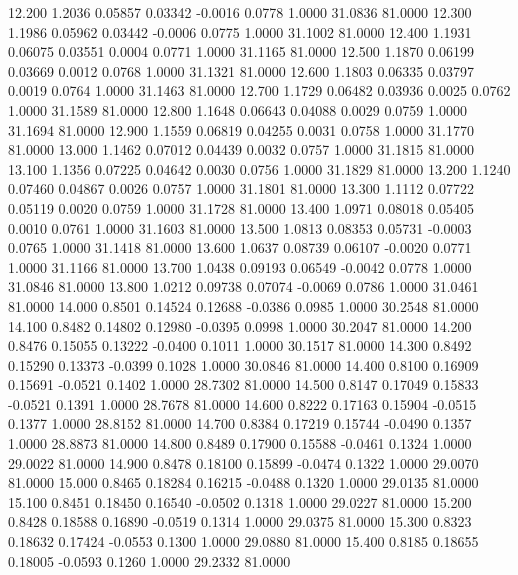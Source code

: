   12.200   1.2036   0.05857   0.03342  -0.0016   0.0778   1.0000  31.0836  81.0000
  12.300   1.1986   0.05962   0.03442  -0.0006   0.0775   1.0000  31.1002  81.0000
  12.400   1.1931   0.06075   0.03551   0.0004   0.0771   1.0000  31.1165  81.0000
  12.500   1.1870   0.06199   0.03669   0.0012   0.0768   1.0000  31.1321  81.0000
  12.600   1.1803   0.06335   0.03797   0.0019   0.0764   1.0000  31.1463  81.0000
  12.700   1.1729   0.06482   0.03936   0.0025   0.0762   1.0000  31.1589  81.0000
  12.800   1.1648   0.06643   0.04088   0.0029   0.0759   1.0000  31.1694  81.0000
  12.900   1.1559   0.06819   0.04255   0.0031   0.0758   1.0000  31.1770  81.0000
  13.000   1.1462   0.07012   0.04439   0.0032   0.0757   1.0000  31.1815  81.0000
  13.100   1.1356   0.07225   0.04642   0.0030   0.0756   1.0000  31.1829  81.0000
  13.200   1.1240   0.07460   0.04867   0.0026   0.0757   1.0000  31.1801  81.0000
  13.300   1.1112   0.07722   0.05119   0.0020   0.0759   1.0000  31.1728  81.0000
  13.400   1.0971   0.08018   0.05405   0.0010   0.0761   1.0000  31.1603  81.0000
  13.500   1.0813   0.08353   0.05731  -0.0003   0.0765   1.0000  31.1418  81.0000
  13.600   1.0637   0.08739   0.06107  -0.0020   0.0771   1.0000  31.1166  81.0000
  13.700   1.0438   0.09193   0.06549  -0.0042   0.0778   1.0000  31.0846  81.0000
  13.800   1.0212   0.09738   0.07074  -0.0069   0.0786   1.0000  31.0461  81.0000
  14.000   0.8501   0.14524   0.12688  -0.0386   0.0985   1.0000  30.2548  81.0000
  14.100   0.8482   0.14802   0.12980  -0.0395   0.0998   1.0000  30.2047  81.0000
  14.200   0.8476   0.15055   0.13222  -0.0400   0.1011   1.0000  30.1517  81.0000
  14.300   0.8492   0.15290   0.13373  -0.0399   0.1028   1.0000  30.0846  81.0000
  14.400   0.8100   0.16909   0.15691  -0.0521   0.1402   1.0000  28.7302  81.0000
  14.500   0.8147   0.17049   0.15833  -0.0521   0.1391   1.0000  28.7678  81.0000
  14.600   0.8222   0.17163   0.15904  -0.0515   0.1377   1.0000  28.8152  81.0000
  14.700   0.8384   0.17219   0.15744  -0.0490   0.1357   1.0000  28.8873  81.0000
  14.800   0.8489   0.17900   0.15588  -0.0461   0.1324   1.0000  29.0022  81.0000
  14.900   0.8478   0.18100   0.15899  -0.0474   0.1322   1.0000  29.0070  81.0000
  15.000   0.8465   0.18284   0.16215  -0.0488   0.1320   1.0000  29.0135  81.0000
  15.100   0.8451   0.18450   0.16540  -0.0502   0.1318   1.0000  29.0227  81.0000
  15.200   0.8428   0.18588   0.16890  -0.0519   0.1314   1.0000  29.0375  81.0000
  15.300   0.8323   0.18632   0.17424  -0.0553   0.1300   1.0000  29.0880  81.0000
  15.400   0.8185   0.18655   0.18005  -0.0593   0.1260   1.0000  29.2332  81.0000
